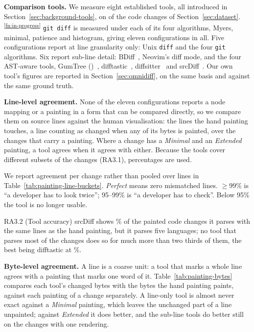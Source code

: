 \documentclass[sigconf,review]{acmart}
\begin{document}
\textbf{Comparison tools.} We measure eight established tools, all introduced in
Section~\ref{sec:background-tools}, on \UnixDiffFixtures{} of the code changes of
Section~\ref{sec:dataset}.\textsuperscript{\ref{fn:in-progress}} \texttt{git diff} is measured
under each of its four algorithms, Myers, minimal, patience and histogram, giving eleven
configurations in all. Five configurations report at line granularity only: Unix \texttt{diff}
and the four \texttt{git} algorithms. Six report sub-line detail: BDiff~\cite{bdiff}, Neovim's
diff mode, and the four AST-aware tools, GumTree (\GumTreeVersion{})~\cite{gumtreediff-2014},
difftastic~\cite{difftastic}, diffsitter~\cite{diffsitter} and srcDiff~\cite{decker-2020}. Our
own tool's figures are reported in Section~\ref{sec:omnidiff}, on the same basis and against the
same ground truth.

\textbf{Line-level agreement.} None of the eleven configurations reports a node mapping or a
painting in a form that can be compared directly, so we compare them on source lines against the
human visualisation: the lines the hand painting touches, a line counting as changed when any of
its bytes is painted, over the \UnixDiffPaintingLineFixtures{} changes that carry a painting.
Where a change has a \emph{Minimal} and an \emph{Extended} painting, a tool agrees when it agrees
with either. Because the tools cover different subsets of the changes (RA3.1), percentages are
used.

We report agreement per change rather than pooled over lines in
Table~\ref{tab:painting-line-buckets}. \emph{Perfect} means zero mismatched lines. $\ge$99\% is
``a developer has to look twice''; 95--99\% is ``a developer has to check''. Below 95\% the tool
is no longer usable.

\begin{resultbox}{RA3.2 (Tool accuracy)}
srcDiff shows \SrcDiffPaintingLinePerfectPct{}\% of the painted code changes it parses with the
same lines as the hand painting, but it parses five languages; no tool that parses most of the
changes does so for much more than two thirds of them, the best being difftastic at
\DifftasticPaintingLinePerfectPct{}\%.
\end{resultbox}



\textbf{Byte-level agreement.} A line is a coarse unit: a tool that marks a whole line agrees with
a painting that marks one word of it. Table~\ref{tab:painting-bytes} compares each tool's changed
bytes with the bytes the hand painting paints, against each painting of a change separately. A
line-only tool is almost never exact against a \emph{Minimal} painting, which leaves the unchanged
part of a line unpainted; against \emph{Extended} it does better, and the sub-line tools do better
still on the changes with one rendering.
\end{document}
